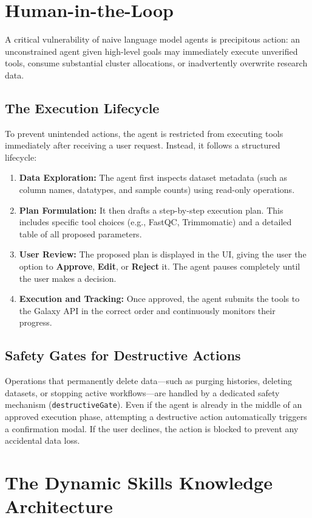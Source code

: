 \section{Human-in-the-Loop}
\label{sec:governance_plan_first}

A critical vulnerability of naive language model agents is precipitous action: an unconstrained agent given high-level goals may immediately execute unverified tools, consume substantial cluster allocations, or inadvertently overwrite research data.
\subsection{The Execution Lifecycle}
To prevent unintended actions, the agent is restricted from executing tools immediately after receiving a user request. Instead, it follows a structured lifecycle:
\begin{enumerate}
\item \textbf{Data Exploration:} The agent first inspects dataset metadata (such as column names, datatypes, and sample counts) using read-only operations.
\item \textbf{Plan Formulation:} It then drafts a step-by-step execution plan. This includes specific tool choices (e.g., FastQC, Trimmomatic) and a detailed table of all proposed parameters.
\item \textbf{User Review:} The proposed plan is displayed in the UI, giving the user the option to \textbf{Approve}, \textbf{Edit}, or \textbf{Reject} it. The agent pauses completely until the user makes a decision.
\item \textbf{Execution and Tracking:} Once approved, the agent submits the tools to the Galaxy API in the correct order and continuously monitors their progress.
\end{enumerate}

\subsection{Safety Gates for Destructive Actions}
Operations that permanently delete data---such as purging histories, deleting datasets, or stopping active workflows---are handled by a dedicated safety mechanism (\texttt{destructiveGate}). Even if the agent is already in the middle of an approved execution phase, attempting a destructive action automatically triggers a confirmation modal. If the user declines, the action is blocked to prevent any accidental data loss.

\section{The Dynamic Skills Knowledge Architecture}
\label{sec:skills_system}

